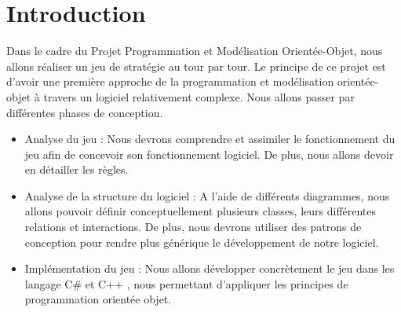 \section{Introduction}

Dans le cadre du Projet Programmation et Modélisation Orientée-Objet, nous allons réaliser un jeu de stratégie au tour par tour. \newline \newline
Le principe de ce projet est d'avoir une première approche de la programmation et modélisation orientée-objet à travers un logiciel relativement complexe. Nous allons passer par différentes phases de conception.

\begin{itemize}
  \item Analyse du jeu : Nous devrons comprendre et assimiler le fonctionnement du jeu afin de concevoir son fonctionnement logiciel. De plus, nous allons devoir en détailler les règles.
  \item Analyse de la structure du logiciel :  A l'aide de différents diagrammes, nous allons pouvoir définir conceptuellement plusieurs classes, leurs différentes relations et interactions. De plus, nous devrons utiliser des patrons de conception pour rendre plus générique le développement de notre logiciel.
  \item Implémentation du jeu : Nous allons développer concrètement le jeu dans les langage C\# et C++ , nous permettant d'appliquer les principes de programmation orientée objet.
\end{itemize}
